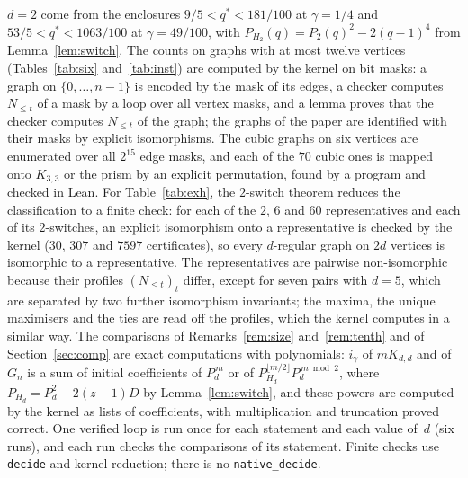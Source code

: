 \documentclass[11pt]{article}
\theoremstyle{remark}
\newcommand{\Nle}[1]{N_{\le #1}}
\begin{document}
$d=2$ come from the enclosures $9/5<q^*<181/100$ at $\gamma=1/4$ and
$53/5<q^*<1063/100$ at $\gamma=49/100$, with
$P_{H_2}(q)=P_2(q)^2-2(q-1)^4$ from Lemma~\ref{lem:switch}. The counts on graphs with
at most twelve vertices (Tables~\ref{tab:six} and~\ref{tab:inst}) are computed
by the kernel on bit masks: a graph on $\{0,\dots,n-1\}$ is encoded by the
mask of its edges, a checker computes $\Nle t$ of a mask by a loop over all
vertex masks, and a lemma proves that the checker computes $\Nle t$ of the
graph; the graphs of the paper are identified with their masks by explicit
isomorphisms. The cubic graphs on six vertices are enumerated over all
$2^{15}$ edge masks, and each of the $70$ cubic ones is mapped onto $K_{3,3}$
or the prism by an explicit permutation, found by a program and checked in
Lean. For Table~\ref{tab:exh}, the $2$-switch theorem reduces the
classification to a finite check: for each of the $2$, $6$ and $60$
representatives and each of its $2$-switches, an explicit isomorphism onto a
representative is checked by the kernel ($30$, $307$ and $7597$
certificates), so every $d$-regular graph on $2d$ vertices is isomorphic to a
representative. The representatives are pairwise non-isomorphic because their
profiles $(\Nle t)_t$ differ, except for seven pairs with $d=5$, which are
separated by two further isomorphism invariants; the maxima, the unique
maximisers and the ties are read off the profiles, which the kernel computes
in a similar way. The comparisons of Remarks~\ref{rem:size} and~\ref{rem:tenth} and of
Section~\ref{sec:comp} are exact computations with polynomials: $i_\gamma$ of
$mK_{d,d}$ and of $G_n$ is a sum of initial coefficients of $P_d^{\,m}$ or of
$P_{H_d}^{\lfloor m/2\rfloor}P_d^{\,m\bmod2}$, where
$P_{H_d}=P_d^2-2(z-1)D$ by Lemma~\ref{lem:switch}, and these powers are
computed by the kernel as lists of coefficients, with multiplication and
truncation proved correct. One verified loop is run once for each statement
and each value of~$d$ (six runs), and each run checks the comparisons of its
statement.
Finite checks use \texttt{decide} and kernel reduction; there is no
\texttt{native\_decide}.
\end{document}
